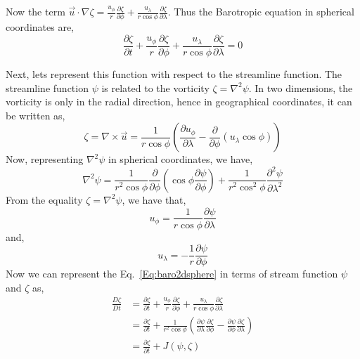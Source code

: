 \documentclass[aps,pra,a4paper,twocolumn,longbibliography,groupedaddress]{revtex4-2}
\begin{document}
Now the term $\vec{u} \cdot \nabla \zeta = \frac{u_{\phi}}{r}\frac{\partial \zeta}{\partial \phi} + \frac{u_{\lambda}}{r\cos\phi}\frac{\partial \zeta}{\partial \lambda}$. Thus the Barotropic equation in spherical coordinates are,
\begin{equation}
    \frac{\partial \zeta}{\partial t} + \frac{u_{\phi}}{r}\frac{\partial \zeta}{\partial \phi} + \frac{u_{\lambda}}{r\cos\phi}\frac{\partial \zeta}{\partial \lambda} = 0
    \label{Eq:baro2dsphere}
\end{equation}

Next, lets represent this function with respect to the streamline function. The streamline function $\psi$ is related to the vorticity $\zeta = \nabla^2 \psi$. In two dimensions, the vorticity is only in the radial direction, hence in geographical coordinates, it can be written as,
\begin{equation}
    \zeta = \nabla \times \vec{u} = \frac{1}{r \cos \phi}\left(\frac{\partial u_\phi}{\partial \lambda} - \frac{\partial}{\partial \phi}( u_\lambda \cos\phi)\right)
\end{equation}
Now, representing $\nabla^2 \psi$ in spherical coordinates, we have,
\begin{equation}
    \nabla^2 \psi = \frac{1}{r^2 \cos\phi} \frac{\partial}{\partial \phi}\left(\cos\phi \frac{\partial \psi}{\partial \phi}\right) + \frac{1}{r^2\cos^2\phi}\frac{\partial^2 \psi}{\partial \lambda^2}
\end{equation}
From the equality $\zeta = \nabla^2 \psi$, we have that,
\begin{equation}
    u_\phi = \frac{1}{r\cos\phi}\frac{\partial \psi}{\partial \lambda}
\end{equation}
and,
\begin{equation}
    u_{\lambda} = -\frac{1}{r}\frac{\partial \psi}{\partial \phi}
\end{equation}
Now we can represent the Eq.~\eqref{Eq:baro2dsphere} in terms of stream function $\psi$ and $\zeta$ as,
\begin{equation}
    \begin{split}
        \frac{D\zeta}{Dt} &= \frac{\partial \zeta}{\partial t} + \frac{u_{\phi}}{r}\frac{\partial \zeta}{\partial \phi} + \frac{u_{\lambda}}{r\cos\phi}\frac{\partial \zeta}{\partial \lambda} \\
        &= \frac{\partial \zeta}{\partial t} + \frac{1}{r^2\cos\phi}\left(\frac{\partial \psi}{\partial \lambda}\frac{\partial \zeta}{\partial \phi} - \frac{\partial \psi}{\partial \phi}\frac{\partial \zeta}{\partial \lambda} \right) \\
        &= \frac{\partial \zeta}{\partial t} + J(\psi, \zeta)
    \end{split}
\end{equation}
\end{document}
